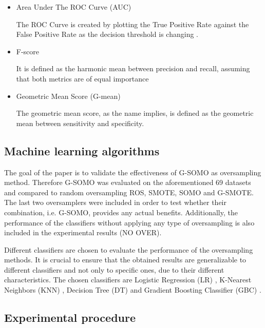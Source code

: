 \documentclass[parskip=full]{scrartcl}
\begin{document}
\begin{itemize}

	\renewcommand\labelitemi{--}

	\item Area Under The ROC Curve (AUC)
	
	The ROC Curve is created by plotting the True Positive Rate against the False Positive Rate as the decision threshold is changing \cite{Hand2009}.

	\item F-score
	
	It is defined as the harmonic mean between precision and recall, assuming that both metrics are of equal importance \cite{Guo2018}

	\item Geometric Mean Score (G-mean)
	
	The geometric mean score, as the name implies, is defined as the geometric mean between sensitivity and specificity.

\end{itemize}

\subsection{Machine learning algorithms}

The goal of the paper is to validate the effectiveness of G-SOMO as oversampling method. Therefore G-SOMO was evaluated on the aforementioned 69 datasets and compared to random oversampling ROS, SMOTE, SOMO and G-SMOTE. The last two oversamplers were included in order to test whether their combination, i.e. G-SOMO, provides any actual benefits. Additionally, the performance of the classifiers without applying any type of oversampling is also included in
the experimental results (NO OVER).

Different classifiers are chosen to evaluate the performance of the oversampling methods. It is crucial to ensure that the obtained results are generalizable to different classifiers and not only to specific ones, due to their different characteristics. The chosen classifiers are Logistic Regression (LR) \cite{McCullagh1989}, K-Nearest Neighbors (KNN) \cite{Cover1967}, Decision Tree (DT) \cite{Salzberg1994} and Gradient Boosting Classifier (GBC) \cite{Friedman2001}.

\subsection{Experimental procedure}
\end{document}
